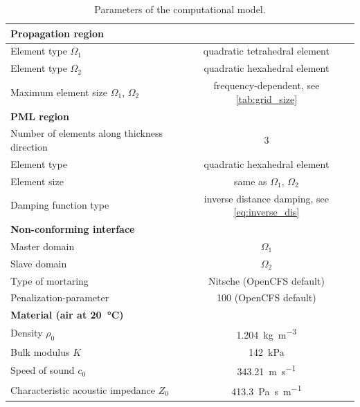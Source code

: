 {\begin{table}
	\centering
	\caption{Parameters of the computational model.}
	\label{tab:model_parameters}
	\begin{tabular}{lc}
		\toprule
		\textbf{Propagation region} & \\
        \midrule
		Element type $\Omega_1$ & quadratic tetrahedral element \\
		Element type $\Omega_2$ & quadratic hexahedral element \\
		Maximum element size $\Omega_1$, $\Omega_2$ & frequency-dependent, see \cref{tab:grid_size}\\
  \midrule
		\textbf{PML region} & \\
        \midrule
		Number of elements along thickness direction & 3 \\
		Element type & quadratic hexahedral element \\
		Element size & same as $\Omega_1$, $\Omega_2$\\
		Damping function type & inverse distance damping, see \cref{eq:inverse_dis} \\
    \midrule
		\textbf{Non-conforming interface} & \\
          \midrule
		Master domain & $\Omega_1$ \\
		Slave domain & $\Omega_2$ \\
		Type of mortaring & Nitsche (OpenCFS default) \\
		Penalization-parameter & 100 (OpenCFS default) \\
    \midrule
		\textbf{Material (air at \SI{20}{\degreeCelsius})} & \\
          \midrule
		Density $\rho_0$ & \SI{1.204}{\kilogram\per\cubic\meter} \\
		Bulk modulus $K$ & \SI{142}{\kilo\pascal} \\
		Speed of sound $c_0$ & \SI{343.21}{\meter\per\second} \\
		Characteristic acoustic impedance $Z_0$ & \SI{413.3}{\pascal\second\per\meter}  \\
		\bottomrule
	\end{tabular}
\end{table}

}
